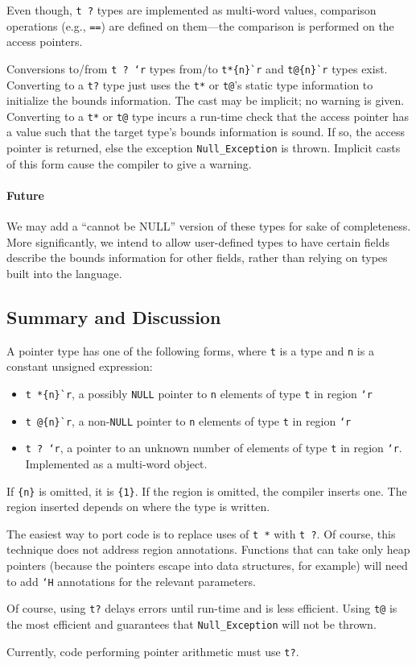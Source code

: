 Even though, \texttt{t ?} types are implemented as multi-word values,
comparison operations (e.g., \texttt{==}) are defined on them---the
comparison is performed on the access pointers.

Conversions to/from \texttt{t ? `r} types from/to \verb|t*{n}`r| and
\verb|t@{n}`r| types exist.  Converting to a \texttt{t?} type just uses
the \texttt{t*} or \texttt{t@}'s static type information to initialize the
bounds information.  The cast may be implicit; no warning is given.
Converting to a \texttt{t*} or \texttt{t@} type incurs a run-time check
that the access pointer has a value such that the target type's bounds
information is sound.  If so, the access pointer is returned, else the
exception \texttt{Null_Exception} is thrown.  Implicit casts of this form
cause the compiler to give a warning.


\paragraph{Future} We may add a ``cannot be NULL'' version of these types
for sake of completeness.  More significantly, we intend to allow
user-defined types to have certain fields describe the bounds
information for other fields, rather than relying on types built into
the language.

\subsection*{\hypertarget{pointer_summary}{Summary and Discussion}}
A pointer type has one of the following forms, where \texttt{t} is a
type and \texttt{n} is a constant unsigned expression:

\begin{itemize}
\item \verb|t *{n}`r|, a possibly \texttt{NULL} pointer to \texttt{n}
  elements of type \texttt{t} in region \texttt{`r}
\item \verb|t @{n}`r|, a non-\texttt{NULL} pointer to \texttt{n} elements
  of type \texttt{t} in region \texttt{`r}
\item \texttt{t ? `r}, a pointer to an unknown number of elements of type
  \texttt{t} in region \texttt{`r}.  Implemented as a multi-word object.
\end{itemize}
If \verb|{n}| is omitted, it is \verb|{1}|.  If the region is omitted,
the compiler inserts one.  The region inserted depends on where the
type is written.

The easiest way to port code is to replace uses of \texttt{t *} with
\texttt{t ?}.  Of course, this technique does not address region
annotations.  Functions that can take only heap pointers (because the
pointers escape into data structures, for example) will need to add
\texttt{`H} annotations for the relevant parameters.

Of course, using \texttt{t?} delays errors until run-time and is less
efficient.  Using \texttt{t@} is the most efficient and
guarantees that \texttt{Null_Exception} will not be thrown.

Currently, code performing pointer arithmetic must use \texttt{t?}.

